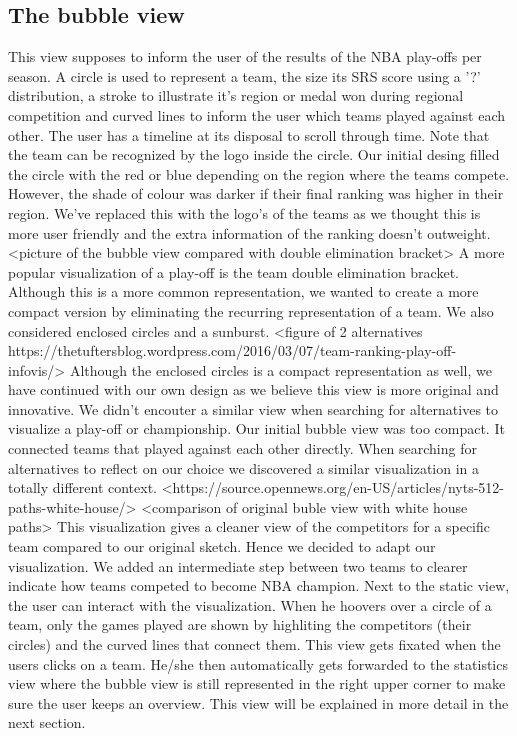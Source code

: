 \documentclass{sigchi}
\begin{document}
\subsection{The bubble view}
This view supposes to inform the user of the results of the NBA play-offs per 
season. A circle is used to represent a team, the size its SRS score using a '?'
distribution, a stroke to illustrate it's region or medal won during regional 
competition and curved lines to inform the user which teams played against each 
other. The user has a timeline at its disposal to scroll through time. Note that
the team can be recognized by the logo inside the circle. Our initial desing filled
the circle with the red or blue depending on the region where the teams compete. 
However, the shade of colour was darker if their final ranking was higher in their
region. We've replaced this with the logo's of the teams as we thought this is more
user friendly and the extra information of the ranking doesn't outweight.
<picture of the bubble view compared with double elimination bracket>
A more popular visualization of a play-off is the team double elimination bracket.
Although this is a more common representation, we wanted to create a more compact
version by eliminating the recurring representation of a team. We also considered 
enclosed circles and a sunburst.
<figure of 2 alternatives https://thetuftersblog.wordpress.com/2016/03/07/team-ranking-play-off-infovis/>
Although the enclosed circles is a compact representation as well, we have continued 
with our own design as we believe this view is more original and innovative. We 
didn't encouter a similar view when searching for alternatives to visualize a 
play-off or championship. 
Our initial bubble view was too compact. It connected teams that played against
each other directly. When searching for alternatives to reflect on our choice we
discovered a similar visualization in a totally different context. 
<https://source.opennews.org/en-US/articles/nyts-512-paths-white-house/>
<comparison of original buble view with white house paths>
This visualization gives a cleaner view of the competitors for a specific team
compared to our original sketch. Hence we decided to adapt our visualization. We
added an intermediate step between two teams to clearer indicate how teams competed
to become NBA champion.
Next to the static view, the user can interact with the visualization. When he 
hoovers over a circle of a team, only the games played are shown by highliting the 
competitors (their circles) and the curved lines that connect them. This view gets 
fixated when the users clicks on a team.
He/she then automatically gets forwarded to the statistics view where the bubble 
view is still represented in the right upper corner to make sure the user keeps
an overview. This view will be explained in more detail in the next section.
\end{document}
